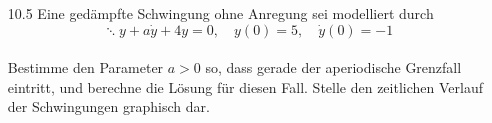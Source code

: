 \documentclass{../HM}
\begin{document}
\begin{enumerate}
		\item[10.5] Eine gedämpfte Schwingung ohne Anregung sei modelliert durch
		$$\ddots{y}+a\dot{y}+4y=0, \quad y(0)=5,\quad \dot{y}(0)=-1$$\\
		Bestimme den Parameter $a>0$ so, dass gerade der aperiodische Grenzfall eintritt, und berechne die Lösung für diesen Fall. Stelle den zeitlichen Verlauf der Schwingungen graphisch dar.
	\end{enumerate}
\end{document}
